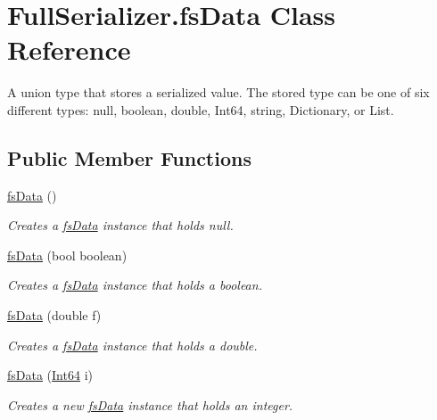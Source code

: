 \hypertarget{class_full_serializer_1_1fs_data}{}\section{Full\+Serializer.\+fs\+Data Class Reference}
\label{class_full_serializer_1_1fs_data}


A union type that stores a serialized value. The stored type can be one of six different types\+: null, boolean, double, Int64, string, Dictionary, or List.  


\subsection*{Public Member Functions}
\begin{DoxyCompactItemize}
\item 
\hyperlink{class_full_serializer_1_1fs_data_a9b5e13a72849cb6c6a6948fac87260c6}{fs\+Data} ()
\begin{DoxyCompactList}\small\item\em Creates a \hyperlink{class_full_serializer_1_1fs_data}{fs\+Data} instance that holds null. \end{DoxyCompactList}\item 
\hyperlink{class_full_serializer_1_1fs_data_ab0316b6b5db7d953fdfe6b352aa1af8e}{fs\+Data} (bool boolean)
\begin{DoxyCompactList}\small\item\em Creates a \hyperlink{class_full_serializer_1_1fs_data}{fs\+Data} instance that holds a boolean. \end{DoxyCompactList}\item 
\hyperlink{class_full_serializer_1_1fs_data_a694c04538e4e37df718316eff8e15635}{fs\+Data} (double f)
\begin{DoxyCompactList}\small\item\em Creates a \hyperlink{class_full_serializer_1_1fs_data}{fs\+Data} instance that holds a double. \end{DoxyCompactList}\item 
\hyperlink{class_full_serializer_1_1fs_data_ab942e5e4fb36b7e815ce0f4195cc84da}{fs\+Data} (\hyperlink{namespace_full_serializer_a6eee33d63b94e40fdfcfc59af9fcfc82afbde23b11d7e59af7828e81144c8b487}{Int64} i)
\begin{DoxyCompactList}\small\item\em Creates a new \hyperlink{class_full_serializer_1_1fs_data}{fs\+Data} instance that holds an integer. \end{DoxyCompactList}\item 

\end{DoxyCompactItemize}
